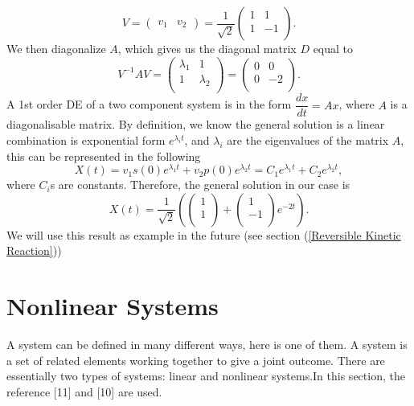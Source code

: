 \documentclass[a4paper]{report}
\theoremstyle{definition}
\begin{document}
\begin{equation}
\label{equ:1.41}
V=
\left(
\begin{array}{cc}
v_1 & v_2
\end{array} 
\right)
= \dfrac{1}{\sqrt{2}}
\left(
\begin{array}{cc}
1 & 1\\
1 & -1\\
\end{array}
\right).
\end{equation}
We then  diagonalize $A$, which gives us the diagonal matrix $D$ equal to
\begin{equation}
V^{-1}AV=
\left(
\begin{array}{cc}
\lambda_1 & 1\\
1 & \lambda_2\\
\end{array}
\right)
=
\left(
\begin{array}{cc}
0 & 0\\
0 & -2\\
\end{array}
\right).
\end{equation}
A 1st order DE of a two component system is in the form $\dfrac{dx}{dt}=Ax$, where $A$ is a diagonalisable matrix. By definition, we know the general solution is a linear combination is exponential form $e^{\lambda_i t}$, and $\lambda_i$ are the eigenvalues of the matrix $A$, this can be represented in the following
\begin{equation}
X(t)=v_1s(0)e^{\lambda_1 t} + v_2p(0)e^{\lambda_2 t} = C_1e^{\lambda_1 t}+C_2e^{\lambda_2 t},
\end{equation} 
where $C_i$s are constants. 
Therefore, the general solution in our case is 
\begin{equation}
\label{equ:3.201}
X(t)= \dfrac{1}{\sqrt{2}}\left( \left(
\begin{array}{c}
1 \\
1 \\
\end{array}
\right)
+
\left(
\begin{array}{c}
1 \\
-1 \\
\end{array}
\right)e^{-2t}\right)
.
\end{equation}
We will use this result as example in the future (see section (\ref{Reversible Kinetic Reaction}))



\chapter{Nonlinear Systems}
A system can be defined in many different ways, here is one of them. A system is a set of related elements working together to give a joint outcome. There are essentially two types of systems: linear and nonlinear systems.In this section, the reference [11] and [10] are used.
\end{document}
